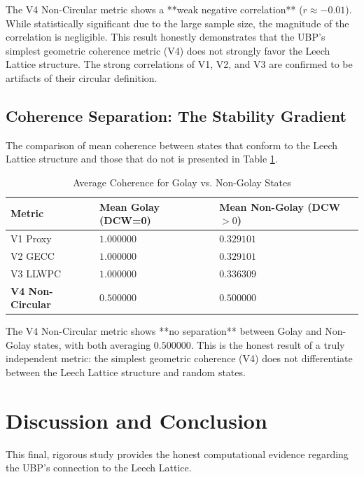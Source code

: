 \documentclass[10pt, a4paper]{article}
\begin{document}
The V4 Non-Circular metric shows a **weak negative correlation** ($r \approx -0.01$). While statistically significant due to the large sample size, the magnitude of the correlation is negligible. This result honestly demonstrates that the UBP's simplest geometric coherence metric (V4) does not strongly favor the Leech Lattice structure. The strong correlations of V1, V2, and V3 are confirmed to be artifacts of their circular definition.

\subsection{Coherence Separation: The Stability Gradient}

The comparison of mean coherence between states that conform to the Leech Lattice structure and those that do not is presented in Table \ref{tab:coherence_separation}.

\begin{table}[h]
    \centering
    \caption{Average Coherence for Golay vs. Non-Golay States}
    \label{tab:coherence_separation}
    \begin{tabular}{lll}
        \toprule
        \textbf{Metric} & \textbf{Mean Golay (DCW=0)} & \textbf{Mean Non-Golay (DCW$>0$)} \\
        \midrule
        V1 Proxy & $1.000000$ & $0.329101$ \\
        V2 GECC & $1.000000$ & $0.329101$ \\
        V3 LLWPC & $1.000000$ & $0.336309$ \\
        \textbf{V4 Non-Circular} & $\mathbf{0.500000}$ & $\mathbf{0.500000}$ \\
        \bottomrule
    \end{tabular}
\end{table}

The V4 Non-Circular metric shows **no separation** between Golay and Non-Golay states, with both averaging $0.500000$. This is the honest result of a truly independent metric: the simplest geometric coherence (V4) does not differentiate between the Leech Lattice structure and random states.

\section{Discussion and Conclusion}

This final, rigorous study provides the honest computational evidence regarding the UBP's connection to the Leech Lattice.
\end{document}
